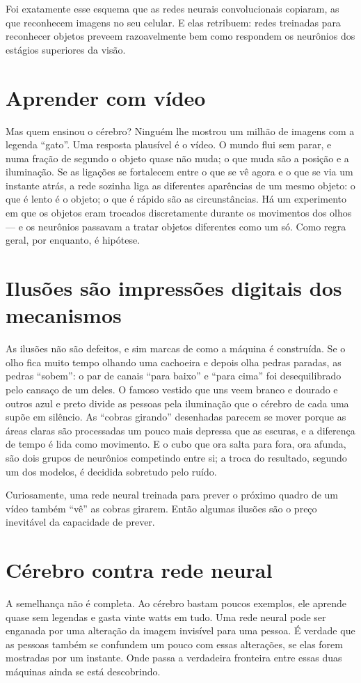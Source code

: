 Foi exatamente esse esquema que as redes neurais convolucionais copiaram, as que reconhecem imagens no seu celular. E elas retribuem: redes treinadas para reconhecer objetos preveem razoavelmente bem como respondem os neurônios dos estágios superiores da visão.

\section*{Aprender com vídeo}

Mas quem ensinou o cérebro? Ninguém lhe mostrou um milhão de imagens com a legenda ``gato''. Uma resposta plausível é o vídeo. O mundo flui sem parar, e numa fração de segundo o objeto quase não muda; o que muda são a posição e a iluminação. Se as ligações se fortalecem entre o que se vê agora e o que se via um instante atrás, a rede sozinha liga as diferentes aparências de um mesmo objeto: o que é lento é o objeto; o que é rápido são as circunstâncias. Há um experimento em que os objetos eram trocados discretamente durante os movimentos dos olhos --- e os neurônios passavam a tratar objetos diferentes como um só. Como regra geral, por enquanto, é hipótese.

\section*{Ilusões são impressões digitais dos mecanismos}

As ilusões não são defeitos, e sim marcas de como a máquina é construída. Se o olho fica muito tempo olhando uma cachoeira e depois olha pedras paradas, as pedras ``sobem'': o par de canais ``para baixo'' e ``para cima'' foi desequilibrado pelo cansaço de um deles. O famoso vestido que uns veem branco e dourado e outros azul e preto divide as pessoas pela iluminação que o cérebro de cada uma supõe em silêncio. As ``cobras girando'' desenhadas parecem se mover porque as áreas claras são processadas um pouco mais depressa que as escuras, e a diferença de tempo é lida como movimento. E o cubo que ora salta para fora, ora afunda, são dois grupos de neurônios competindo entre si; a troca do resultado, segundo um dos modelos, é decidida sobretudo pelo ruído.

Curiosamente, uma rede neural treinada para prever o próximo quadro de um vídeo também ``vê'' as cobras girarem. Então algumas ilusões são o preço inevitável da capacidade de prever.

\section*{Cérebro contra rede neural}

A semelhança não é completa. Ao cérebro bastam poucos exemplos, ele aprende quase sem legendas e gasta vinte watts em tudo. Uma rede neural pode ser enganada por uma alteração da imagem invisível para uma pessoa. É verdade que as pessoas também se confundem um pouco com essas alterações, se elas forem mostradas por um instante. Onde passa a verdadeira fronteira entre essas duas máquinas ainda se está descobrindo.

